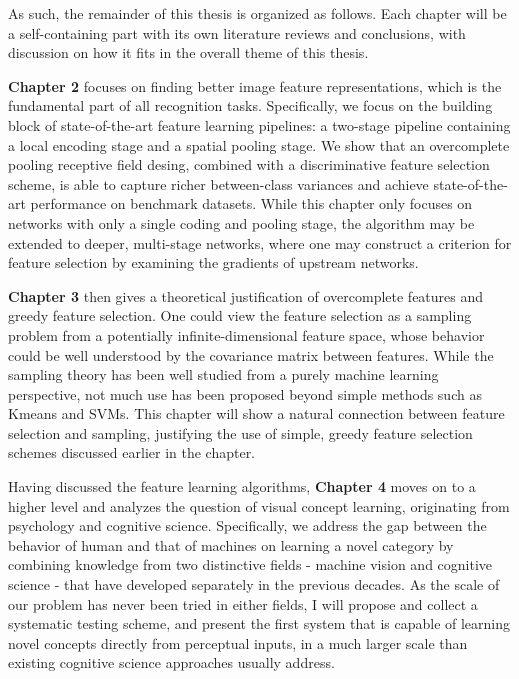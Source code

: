 As such, the remainder of this thesis is organized as follows. Each chapter will be a self-containing part with its own literature reviews and conclusions, with discussion on how it fits in the overall theme of this thesis.

{\bfseries Chapter 2} focuses on finding better image feature representations, which is the fundamental part of all recognition tasks. Specifically, we focus on the building block of state-of-the-art feature learning pipelines: a two-stage pipeline containing a local encoding stage and a spatial pooling stage. We show that an overcomplete pooling receptive field desing, combined with a discriminative feature selection scheme, is able to capture richer between-class variances and achieve state-of-the-art performance on benchmark datasets. While this chapter only focuses on networks with only a single coding and pooling stage, the algorithm may be extended to deeper, multi-stage networks, where one may construct a criterion for feature selection by examining the gradients of upstream networks.

{\bfseries Chapter 3} then gives a theoretical justification of overcomplete features and greedy feature selection. One could view the feature selection as a sampling problem from a potentially infinite-dimensional feature space, whose behavior could be well understood by the covariance matrix between features. While the \nystrom sampling theory has been well studied from a purely machine learning perspective, not much use has been proposed beyond simple methods such as Kmeans and SVMs. This chapter will show a natural connection between feature selection and \nystrom sampling, justifying the use of simple, greedy feature selection schemes discussed earlier in the chapter.

Having discussed the feature learning algorithms, {\bfseries Chapter 4} moves on to a higher level and analyzes the question of visual concept learning, originating from psychology and cognitive science. Specifically, we address the gap between the behavior of human and that of machines on learning a novel category by combining knowledge from two distinctive fields - machine vision and cognitive science - that have developed separately in the previous decades. As the scale of our problem has never been tried in either fields, I will propose and collect a systematic testing scheme, and present the first system that is capable of learning novel concepts directly from perceptual inputs, in a much larger scale than existing cognitive science approaches usually address.

